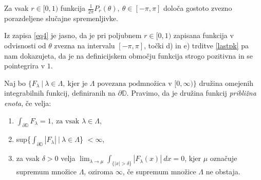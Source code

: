 \documentclass[mat1]{fmfdelo}
\begin{document}
    \begin{posledica}
        Za vsak $r \in [0, 1)$ funkcija $\frac{1}{2 \pi} P_r(\theta),~ \theta \in [-\pi, \pi]$ določa gostoto zvezno porazdeljene slučajne spremenljivke.
    \end{posledica}
    \begin{dokaz}
        Iz zapisa \eqref{eq4} je jasno, da je pri poljubnem $r \in [0,1)$ zapisana funkcija v odvisnosti od $\theta$ zvezna na intervalu $[-\pi, \pi]$, točki d) in e) trditve \ref{lastpk} pa nam dokazujeta, da je na definicijskem območju funkcija strogo pozitivna in se pointegrira v $1$.
    \end{dokaz}

    \begin{definicija}
        Naj bo $\{F_{\lambda}~|~\lambda \in \Lambda,~\text{kjer je $\Lambda$ povezana podmnožica v $[0, \infty)$}\}$ družina omejenih integrabilnih funkcij, definiranih na $\partial \mathbb{D}$. Pravimo, da je družina funkcij \emph{približna enota}, če velja:
        \begin{enumerate}[label={\Alph*)}]
            \item $\int_{\partial \mathbb{D}}{F_\lambda} = 1,~\text{za vsak $\lambda \in \Lambda$}$,
            \item sup\{$\int_{\partial \mathbb{D}}{\left| F_{\lambda}\right|}~|~\lambda \in \Lambda$\} $< \infty$,
            \item za vsak $\delta > 0$ velja $\lim_{\lambda \to \mu}{\int_{\{|x| > \delta\}}{|F_{\lambda}(x)|~dx}} = 0$, kjer $\mu$ označuje supremum množice $\Lambda$, oziroma $\infty$, če supremum množice $\Lambda$ ne obstaja.
        \end{enumerate}
    \end{definicija}
\end{document}

